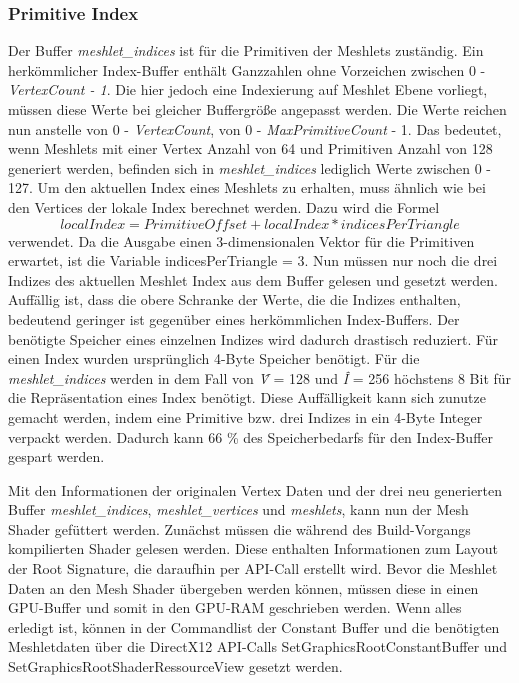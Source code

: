 \subsubsection*{Primitive Index}
Der Buffer \textit{meshlet\_indices} ist für die Primitiven der Meshlets zuständig.
Ein herkömmlicher Index-Buffer enthält Ganzzahlen ohne Vorzeichen zwischen 0 - \textit{VertexCount - 1}.
Die hier jedoch eine Indexierung auf Meshlet Ebene vorliegt, müssen diese Werte bei gleicher Buffergröße angepasst werden.
Die Werte reichen nun anstelle von 0 - \textit{VertexCount}, von 0 - \textit{MaxPrimitiveCount} - 1.
Das bedeutet, wenn Meshlets mit einer Vertex Anzahl von 64 und Primitiven Anzahl von 128 generiert werden, befinden sich in \textit{meshlet\_indices} lediglich Werte zwischen 0 - 127.
Um den aktuellen Index eines Meshlets zu erhalten, muss ähnlich wie bei den Vertices der lokale Index berechnet werden.
Dazu wird die Formel
\begin{equation*}
localIndex = PrimitiveOffset + localIndex * indicesPerTriangle
\end{equation*}
verwendet.
Da die Ausgabe einen 3-dimensionalen Vektor für die Primitiven erwartet, ist die Variable indicesPerTriangle = 3.
Nun müssen nur noch die drei Indizes des aktuellen Meshlet Index aus dem Buffer gelesen und gesetzt werden.
\newline
Auffällig ist, dass die obere Schranke der Werte, die die Indizes enthalten, bedeutend geringer ist gegenüber eines herkömmlichen Index-Buffers.
Der benötigte Speicher eines einzelnen Indizes wird dadurch drastisch reduziert.
Für einen Index wurden ursprünglich 4-Byte Speicher benötigt.
Für die \textit{meshlet\_indices} werden in dem Fall von \textit{\^{V}} = 128 und \textit{\^{I}} = 256 höchstens 8 Bit für die Repräsentation eines Index benötigt.
Diese Auffälligkeit kann sich zunutze gemacht werden, indem eine Primitive bzw. drei Indizes in ein 4-Byte Integer verpackt werden.
Dadurch kann 66 \% des Speicherbedarfs für den Index-Buffer gespart werden.

Mit den Informationen der originalen Vertex Daten und der drei neu generierten Buffer \textit{meshlet\_indices}, \textit{meshlet\_vertices} und \textit{meshlets}, kann nun der Mesh Shader gefüttert werden.
Zunächst müssen die während des Build-Vorgangs kompilierten Shader gelesen werden.
Diese enthalten Informationen zum Layout der Root Signature, die daraufhin per API-Call erstellt wird.
Bevor die Meshlet Daten an den Mesh Shader übergeben werden können, müssen diese in einen GPU-Buffer und somit in den GPU-RAM geschrieben werden.
Wenn alles erledigt ist, können in der Commandlist der Constant Buffer und die benötigten Meshletdaten über die DirectX12 API-Calls SetGraphicsRootConstantBuffer und SetGraphicsRootShaderRessourceView gesetzt werden.

